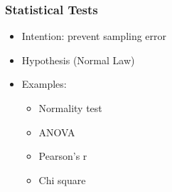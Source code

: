 \begin{frame}\frametitle{Statistical Tests}
   \begin{itemize}
      \item Intention: prevent sampling error
      \item Hypothesis (Normal Law)
      \item Examples:
      \begin{itemize}
         \item Normality test
         \item ANOVA
         \item Pearson's r
         \item Chi square
      \end{itemize}
   \end{itemize}
\end{frame}



